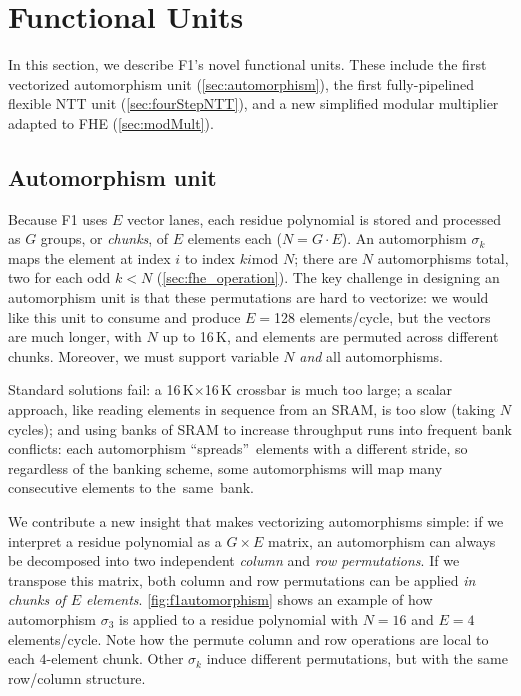 \section{Functional Units}
\label{sec:FUs}

In this section, we describe F1's novel functional units. These include the
first vectorized automorphism unit (\autoref{sec:automorphism}), the first
fully-pipelined flexible NTT unit (\autoref{sec:fourStepNTT}), and a new
simplified modular multiplier adapted to FHE (\autoref{sec:modMult}).

\subsection{Automorphism unit}\label{sec:automorphism}

\figFOneAutomorphism

Because F1 uses $E$ vector lanes, each residue polynomial is stored and
processed as $G$ groups, or \emph{chunks}, of $E$ elements each ($N=G\cdot E$).
An automorphism $\sigma_k$ maps the element at index $i$ to index $ki \textrm{
mod } N$; there are $N$ automorphisms total, two for each odd $k < N$
(\autoref{sec:fhe_operation}). The key challenge in designing an automorphism
unit is that these permutations are hard to vectorize: we would like this unit
to consume and produce $E=$128 elements/cycle, but the vectors are much longer,
with $N$ up to 16\,K, and elements are permuted across different chunks.
Moreover, we must support variable $N$ \emph{and} all automorphisms.

Standard solutions fail: a 16\,K$\times$16\,K crossbar is much too large; a
scalar approach, like reading elements in sequence from an SRAM, is too slow
(taking $N$ cycles); and using banks of SRAM to increase throughput runs into
frequent bank conflicts: each automorphism ``spreads''~elements with a
different stride, so regardless of the banking scheme, some automorphisms will
map many consecutive elements to the~same~bank.

We contribute a new insight that makes vectorizing automorphisms simple: if we
interpret a residue polynomial as a $G \times E$ matrix, an automorphism can
always be decomposed into two independent \emph{column} and \emph{row
permutations}. If we transpose this matrix, both column and row permutations
can be applied \emph{in chunks of $E$ elements}. \autoref{fig:f1automorphism}
shows an example of how automorphism $\sigma_3$ is applied to a residue
polynomial with $N=16$ and $E=4$ elements/cycle. Note how the permute column
and row operations are local to each $4$-element chunk. Other $\sigma_k$ induce
different permutations, but with the same row/column structure.

